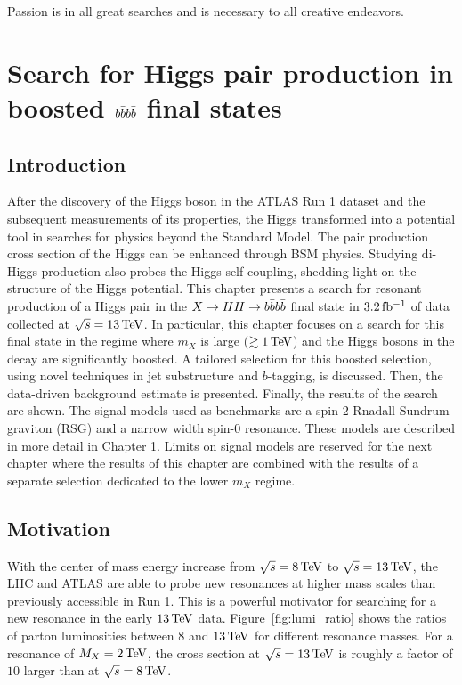 \begin{savequote}[75mm]
Passion is in all great searches and is necessary to all creative endeavors.
\end{savequote}

\chapter{Search for Higgs pair production in boosted $b\bar{b}b\bar{b}$ final states}
\label{chap:boosted4b}

\section{Introduction}

After the discovery of the Higgs boson in the ATLAS Run 1 dataset and the subsequent measurements of its properties, the Higgs transformed into a potential tool in searches for physics beyond the Standard Model. The pair production cross section of the Higgs can be enhanced through BSM physics. Studying di-Higgs production also probes the Higgs self-coupling, shedding light on the structure of the Higgs potential. This chapter presents a search for resonant production of a Higgs pair in the $X\to HH \to b\bar{b}b\bar{b}$ final state in $3.2 \mbox{\,fb$^{-1}$}$ of data collected at $\sqrt{s} = 13 \TeV$. In particular, this chapter focuses on a search for this final state in the regime where $m_{X}$ is large ($\gtrsim 1 \TeV$) and the Higgs bosons in the decay are significantly boosted. A tailored selection for this boosted selection, using novel techniques in jet substructure and $b$-tagging, is discussed. Then, the data-driven background estimate is presented. Finally, the results of the search are shown. The signal models used as benchmarks are a spin-$2$ Rnadall Sundrum graviton (RSG) and a narrow width spin-$0$ resonance. These models are described in more detail in Chapter 1. Limits on signal models are reserved for the next chapter where the results of this chapter are combined with the results of a separate selection dedicated to the lower $m_X$ regime. 

\section{Motivation}

With the center of mass energy increase from $\sqrt{s} = 8 \TeV$ to $\sqrt{s} = 13 \TeV$, the LHC and ATLAS are able to probe new resonances at higher mass scales than previously accessible in Run 1. This is a powerful motivator for searching for a new resonance in the early $13 \TeV$ data. Figure~\ref{fig:lumi_ratio} shows the ratios of parton luminosities between $8$ and $13 \TeV$ for different resonance masses. For a resonance of $M_{X} = 2 \TeV$, the cross section at $\sqrt{s} = 13 \TeV$ is roughly a factor of $10$ larger than at $\sqrt{s} = 8 \TeV$. 

